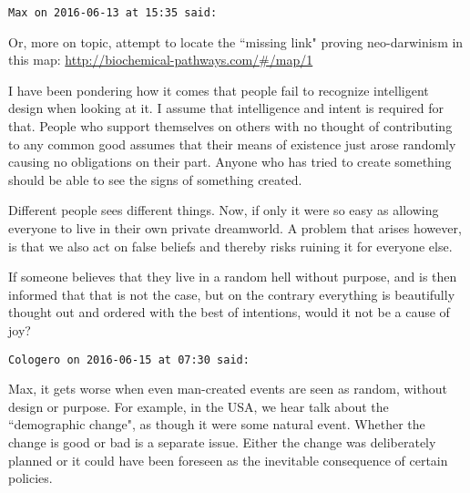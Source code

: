 \begin{footnotesize}\begin{sffamily}

\texttt{Max on 2016-06-13 at 15:35 said: }

Or, more on topic, attempt to locate the ``missing link" proving neo-darwinism in this map: \url{http://biochemical-pathways.com/\#/map/1} 

I have been pondering how it comes that people fail to recognize intelligent design when looking at it. I assume that intelligence and intent is required for that. People who support themselves on others with no thought of contributing to any common good assumes that their means of existence just arose randomly causing no obligations on their part. Anyone who has tried to create something should be able to see the signs of something created. 

Different people sees different things. Now, if only it were so easy as allowing everyone to live in their own private dreamworld. A problem that arises however, is that we also act on false beliefs and thereby risks ruining it for everyone else.

If someone believes that they live in a random hell without purpose, and is then informed that that is not the case, but on the contrary everything is beautifully thought out and ordered with the best of intentions, would it not be a cause of joy?


\hfill

\texttt{Cologero on 2016-06-15 at 07:30 said: }

Max, it gets worse when even man-created events are seen as random, without design or purpose. For example, in the USA, we hear talk about the ``demographic change", as though it were some natural event. Whether the change is good or bad is a separate issue. Either the change was deliberately planned or it could have been foreseen as the inevitable consequence of certain policies.


\hfill


\end{sffamily}\end{footnotesize}
